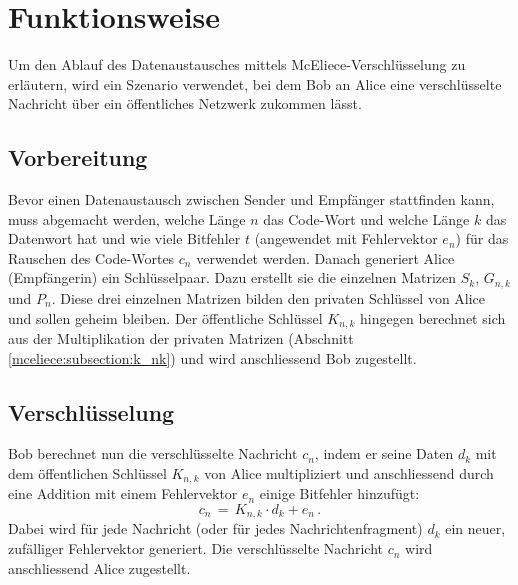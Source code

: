 %
%
%
\section{Funktionsweise 
\label{mceliece:section:funktionsweise}}
Um den Ablauf des Datenaustausches mittels McEliece-Verschlüsselung zu erläutern,
wird ein Szenario verwendet,
bei dem Bob an Alice eine verschlüsselte Nachricht über ein öffentliches Netzwerk zukommen lässt.

\subsection{Vorbereitung
\label{mceliece:section:vorbereitung}}
Bevor einen Datenaustausch zwischen Sender und Empfänger stattfinden kann,
muss abgemacht werden, welche Länge $n$ das Code-Wort und welche Länge $k$ das Datenwort hat
und wie viele Bitfehler $t$ (angewendet mit Fehlervektor $e_n$)
für das Rauschen des Code-Wortes $c_n$ verwendet werden.
Danach generiert Alice (Empfängerin) ein Schlüsselpaar.
Dazu erstellt sie die einzelnen Matrizen $S_k$, $G_{n,k}$ und $P_n$.
Diese drei einzelnen Matrizen bilden den privaten Schlüssel von Alice
und sollen geheim bleiben.
Der öffentliche Schlüssel $K_{n,k}$ hingegen berechnet sich
aus der Multiplikation der privaten Matrizen (Abschnitt \ref{mceliece:subsection:k_nk})
und wird anschliessend Bob zugestellt.

\subsection{Verschlüsselung
\label{mceliece:section:verschl}}
Bob berechnet nun die verschlüsselte Nachricht $c_n$, indem er seine Daten $d_k$
mit dem öffentlichen Schlüssel $K_{n,k}$ von Alice multipliziert
und anschliessend durch eine Addition mit einem Fehlervektor $e_n$ einige Bitfehler hinzufügt:
\[
    c_n\,=\,K_{n,k}\cdot d_k + e_n\,.
\]
Dabei wird für jede Nachricht (oder für jedes Nachrichtenfragment) $d_k$
ein neuer, zufälliger Fehlervektor generiert.
Die verschlüsselte Nachricht $c_n$ wird anschliessend Alice zugestellt.


